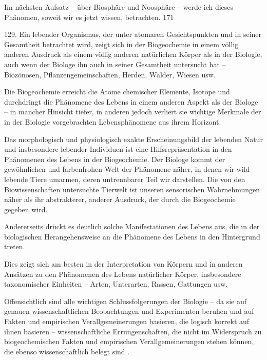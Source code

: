 \documentclass[11pt,a4paper]{book}
\begin{document}
Im nächsten Aufsatz -- über Biosphäre und Noosphäre -- werde ich dieses Phänomen, soweit wir es jetzt wissen, betrachten. 171



129. Ein lebender Organismus, der unter atomaren Gesichtspunkten und in seiner Gesamtheit betrachtet wird, zeigt sich in der Biogeochemie in einem völlig anderen Ausdruck als einem völlig anderen natürlichen Körper als in der Biologie, auch wenn der Biologe ihn auch in seiner Gesamtheit untersucht hat -- Biozönosen, Pflanzengemeinschaften, Herden, Wälder, Wiesen usw.



Die Biogeochemie erreicht die Atome chemischer Elemente, Isotope und durchdringt die Phänomene des Lebens in einem anderen Aspekt als der Biologe -- in mancher Hinsicht tiefer, in anderen jedoch verliert sie wichtige Merkmale der in der Biologie vorgebrachten Lebensphänomene aus ihrem Horizont.



Das morphologisch und physiologisch exakte Erscheinungsbild der lebenden Natur und insbesondere lebender Individuen ist eine Hilfsrepräsentation in den Phänomenen des Lebens in der Biogeochemie. Der Biologe kommt der gewöhnlichen und farbenfrohen Welt der Phänomene näher, in denen wir wild lebende Tiere umarmen, deren untrennbarer Teil wir darstellen. Die von den Biowissenschaften untersuchte Tierwelt ist unseren sensorischen Wahrnehmungen näher als ihr abstrakterer, anderer Ausdruck, der durch die Biogeochemie gegeben wird.



Andererseits drückt es deutlich solche Manifestationen des Lebens aus, die in der biologischen Herangehensweise an die Phänomene des Lebens in den Hintergrund treten.



Dies zeigt sich am besten in der Interpretation von Körpern und in anderen Ansätzen zu den Phänomenen des Lebens natürlicher Körper, insbesondere taxonomischer Einheiten -- Arten, Unterarten, Rassen, Gattungen usw.



Offensichtlich sind alle wichtigen Schlussfolgerungen der Biologie -- da sie auf genauen wissenschaftlichen Beobachtungen und Experimenten beruhen und auf Fakten und empirischen Verallgemeinerungen basieren, die logisch korrekt auf ihnen basieren -- wissenschaftliche Errungenschaften, die nicht im Widerspruch zu biogeochemischen Fakten und empirischen Verallgemeinerungen stehen können, die ebenso wissenschaftlich belegt sind .
\end{document}
